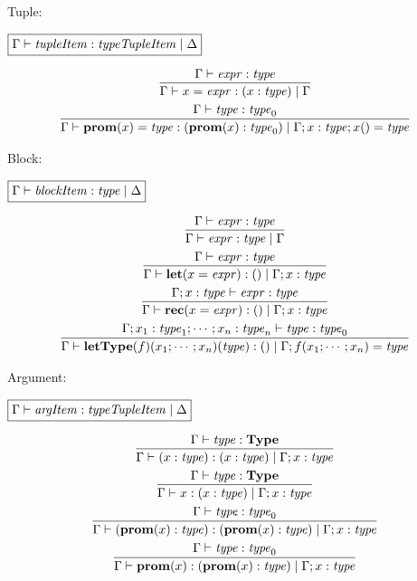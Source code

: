 Tuple:

$\fbox{$\Gamma \vdash \mathit{tupleItem}: \mathit{typeTupleItem} \mid \Delta$}$

\begin{gather*}
  \infer{\Gamma \vdash x = \mathit{expr}: (x: \mathit{type}) \mid \Gamma}{
    \Gamma \vdash \mathit{expr}: \mathit{type}
  }
  \\
  \infer{\Gamma \vdash \mathbf{prom}(x) = \mathit{type}: (\mathbf{prom}(x): \mathit{type}_0) \mid \Gamma; x: \mathit{type}; x() = \mathit{type}}{
    \Gamma \vdash \mathit{type}: \mathit{type}_0
  }
\end{gather*}

Block:

$\fbox{$\Gamma \vdash \mathit{blockItem}: \mathit{type} \mid \Delta$}$

\begin{gather*}
  \infer{\Gamma \vdash \mathit{expr}: \mathit{type} \mid \Gamma}{
    \Gamma \vdash \mathit{expr}: \mathit{type}
  }
  \\
  \infer{\Gamma \vdash \mathbf{let}(x = \mathit{expr}): () \mid \Gamma; x: \mathit{type}}{
    \Gamma \vdash \mathit{expr}: \mathit{type}
  }
  \\
  \infer{\Gamma \vdash \mathbf{rec}(x = \mathit{expr}): () \mid \Gamma; x: \mathit{type}}{
    \Gamma; x: \mathit{type} \vdash \mathit{expr}: \mathit{type}
  }
  \\
  \infer{\Gamma \vdash \mathbf{letType}(f)(x_1; \cdots; x_n)(\mathit{type}): () \mid \Gamma; f(x_1; \cdots; x_n) = \mathit{type}}{
    \Gamma; x_1: \mathit{type}_1; \cdots; x_n: \mathit{type}_n \vdash \mathit{type}: \mathit{type}_0
  }
\end{gather*}

Argument:

$\fbox{$\Gamma \vdash \mathit{argItem}: \mathit{typeTupleItem} \mid \Delta$}$

\begin{gather*}
  \infer{\Gamma \vdash (x: \mathit{type}): (x: \mathit{type}) \mid \Gamma; x: \mathit{type}}{
    \Gamma \vdash \mathit{type}: \mathbf{Type}
  }
  \\
  \infer{\Gamma \vdash x: (x: \mathit{type}) \mid \Gamma; x: \mathit{type}}{
    \Gamma \vdash \mathit{type}: \mathbf{Type}
  }
  \\
  \infer{\Gamma \vdash (\mathbf{prom}(x): \mathit{type}): (\mathbf{prom}(x): \mathit{type}) \mid \Gamma; x: \mathit{type}}{
    \Gamma \vdash \mathit{type}: \mathit{type}_0
  }
  \\
  \infer{\Gamma \vdash \mathbf{prom}(x): (\mathbf{prom}(x): \mathit{type}) \mid \Gamma; x: \mathit{type}}{
    \Gamma \vdash \mathit{type}: \mathit{type}_0
  }
\end{gather*}

